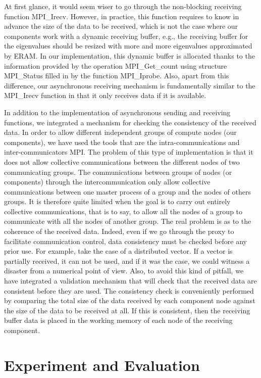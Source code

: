 At first glance, it would seem wiser to go through the non-blocking receiving function MPI\_Irecv. However, in practice, this function requires to know in advance the size of the data to be received, which is not the case where our components work with a dynamic receiving buffer, e.g., the receiving buffer for the eigenvalues should be resized with more and more eigenvalues approximated by ERAM. In our implementation, this dynamic buffer is allocated thanks to the information provided by the operation MPI\_Get\_count using structure MPI\_Status filled in by the function MPI\_Iprobe. Also, apart from this difference, our asynchronous receiving mechanism is fundamentally similar to the MPI\_Irecv function in that it only receives data if it is available. 

In addition to the implementation of asynchronous sending and receiving functions, we integrated a mechanism for checking the consistency of the received data. In order to allow different independent groups of compute nodes (our components), we have used the tools that are the intra-communications and inter-communicators MPI. The problem of this type of implementation is that it does not allow collective communications between the different nodes of two communicating groups. The communications between groups of nodes (or components)  through the intercommunication only allow collective communications between one master process of a group and the nodes of others groups. It is therefore quite limited when the goal is to carry out entirely collective communications, that is to say, to allow all the nodes of a group to communicate with all the nodes of another group.  The real problem is as to the coherence of the received data. Indeed, even if we go through the proxy to facilitate communication control, data consistency must be checked before any prior use. For example, take the case of a distributed vector. If a vector is partially received, it can not be used, and if it was the case, we could witness a disaster from a numerical point of view. Also, to avoid this kind of pitfall, we have integrated a validation mechanism that will check that the received data are consistent before they are used. The consistency check is conveniently performed by comparing the total size of the data received by each component node against the size of the data to be received at all. If this is consistent, then the receiving buffer data is placed in the working memory of each node of the receiving component.


\section{Experiment and Evaluation}\label{Experiment and Evaluation}

